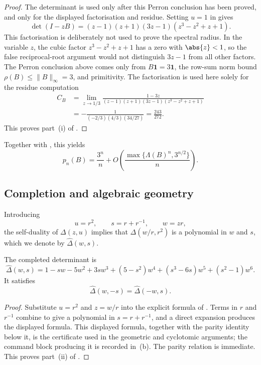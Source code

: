 \begin{proof}
The determinant is used only after this Perron conclusion has been
proved, and only for the displayed factorisation and residue. Setting
\(u=1\) in
 gives
\[
  \det(I-zB)=(z-1)(z+1)(3z-1)(z^3-z^2+z+1).
\]
This factorisation is deliberately not used to prove the spectral
radius. In the variable \(z\), the cubic factor \(z^3-z^2+z+1\) has a
zero with \(\abs{z}<1\), so the false reciprocal-root argument would not
distinguish \(3z-1\) from all other factors. The Perron conclusion above
comes only from \(B\mathbf1=3\mathbf1\), the row-sum norm bound
\(\rho(B)\le\|B\|_\infty=3\), and primitivity. The factorisation is used
here solely for the residue computation
\[
  \begin{aligned}
  C_B
  &=\lim_{z\to1/3}
    \frac{1-3z}{(z-1)(z+1)(3z-1)(z^3-z^2+z+1)}  \\
  &=-\frac{1}{(-2/3)(4/3)(34/27)}
    =\frac{243}{272}.
  \end{aligned}
\]
This proves part~\textup{(i)} of
.
\end{proof}


Together with , this yields
\[
  p_n(B)=\frac{3^n}{n}
  +O\!\left(\frac{\max\{\Lambda(B)^n,3^{n/2}\}}{n}\right).
\]


\subsection{Completion and algebraic geometry}

Introducing
\[
  u=r^2,\qquad s=r+r^{-1},\qquad w=zr,
\]
the self-duality of \(\Delta(z,u)\) implies that
\(\Delta(w/r,r^2)\) is a polynomial in \(w\) and \(s\), which we denote
by \(\widehat\Delta(w,s)\).

\begin{proposition}
  \label{prop:sync-hatdelta-completion}
  The completed determinant is
  \[
    \widehat\Delta(w,s)
    =1-sw-5w^2+3sw^3+(5-s^2)w^4+(s^3-6s)w^5+(s^2-1)w^6.
  \]
  It satisfies
  \[
    \widehat\Delta(w,-s)=\widehat\Delta(-w,s).
  \]
\end{proposition}

\begin{proof}
Substitute \(u=r^2\) and \(z=w/r\) into the explicit formula of
. Terms in \(r\) and \(r^{-1}\)
combine to give a polynomial in \(s=r+r^{-1}\), and a direct expansion
produces the displayed formula. This displayed formula, together with
the parity identity below it, is the certificate used in the geometric
and cyclotomic arguments; the command block producing it is
recorded in \,\textup{(b)}. The parity
relation is immediate. This proves part~\textup{(ii)} of
.
\end{proof}

